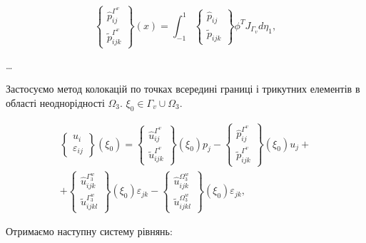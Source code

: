 \begin{equation*}
    \left\{ \begin{array}{lr} \hat{p}_{ij}^{\Gamma^v} \\ \tilde{p}_{ijk}^{\Gamma^v} \end{array} \right\}(x) =
    \int_{-1}^{1} \left\{ \begin{array}{lr} \hat{p}_{ij} \\ \tilde{p}_{ijk} \end{array} \right\} 
    \phi^T J_{\Gamma_v} d \eta_1,
\end{equation*}

\dots

Застосуємо метод колокацій по точках всередині границі і трикутних елементів в області неоднорідності $\Omega_3$. 
$\xi_0 \in \Gamma_v \cup \Omega_3$.

\begin{equation}
    \begin{split}
        \left\{ \begin{array}{lr} u_i \\ \varepsilon_{ij}\end{array} \right\}(\xi_0) =  
        \left\{ \begin{array}{lr} \hat{u}_{ij}^{\Gamma^v} \\ \tilde{u}_{ijk}^{\Gamma^v} \end{array} \right\}(\xi_0) p_j -
        \left\{ \begin{array}{lr} \hat{p}_{ij}^{\Gamma^v} \\ \tilde{p}_{ijk}^{\Gamma^v} \end{array} \right\}(\xi_0) u_j + \\
        + \left\{ \begin{array}{lr} \hat{u}_{ijk}^{\Gamma_3^w} \\ \tilde{u}_{ijkl}^{\Gamma_3^w} \end{array} \right\}(\xi_0) 
        \varepsilon_{jk}  
        - \left\{ \begin{array}{lr} \hat{u}_{ijk}^{\Omega_3^w} \\ \tilde{u}_{ijkl}^{\Omega_3^w} \end{array} \right\}(\xi_0) 
        \varepsilon_{jk},  
    \end{split}
\end{equation}

Отримаємо наступну систему рівнянь:

